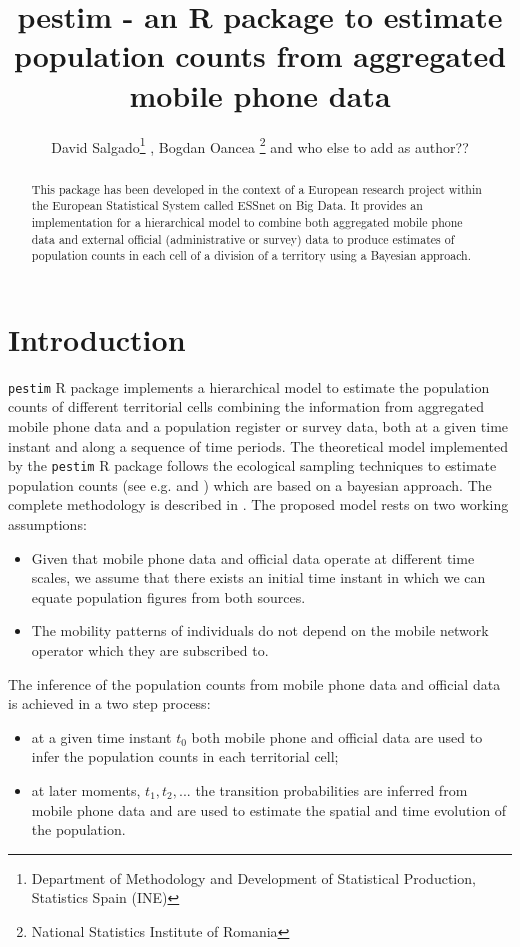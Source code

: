 \documentclass[12pt, a4paper]{article}
\title{pestim - an R package to estimate population counts from aggregated mobile phone data}
\author{David Salgado\footnote{Department of Methodology and Development of Statistical Production, Statistics Spain (INE)} , Bogdan Oancea \footnote{National Statistics Institute of Romania} and who else to add as author??}
\date{}
\begin{document}
\maketitle

\begin{abstract}
This package has been developed in the context of a European research project 
within the European Statistical System called ESSnet on Big Data.
It provides an implementation for a hierarchical model to combine both 
aggregated mobile phone data and external official (administrative or survey) 
data to produce estimates of population counts in each cell of a division of a territory using a Bayesian approach.
\end{abstract}


\section{Introduction}

\texttt{pestim} R package implements a hierarchical model to estimate the population counts of different territorial cells 
combining the information from aggregated 
mobile phone data and a population register or survey data, both at a given time instant and along a 
sequence of time periods. The theoretical model implemented by the \texttt{pestim} R package
follows the ecological sampling techniques to estimate population counts (see e.g. \cite{ManNacAlb15a} and 
\cite{RoyDor08a}) which are based on a bayesian approach. The complete methodology is described in \cite{methodology}.
The proposed model rests on two working assumptions:
\begin{itemize}
	\item Given that mobile phone data and official data operate at different 
time scales, we assume that there exists an initial time instant 
in which we can equate population figures from both sources.
	\item The mobility patterns of individuals do not depend on the mobile 
network operator which they are subscribed to.
\end{itemize}

The inference of the population counts from mobile phone data and official data is achieved in a two step process:
\begin{itemize}
	\item {at a given time instant $t_{0}$ both mobile phone and 
official data are used to infer the population counts in each territorial cell;}
	\item {at later moments, $t_{1}, t_{2},...$ the transition probabilities are inferred from mobile phone 
	data and are used to estimate the spatial and time evolution of the population.}
\end{itemize}
\end{document}
